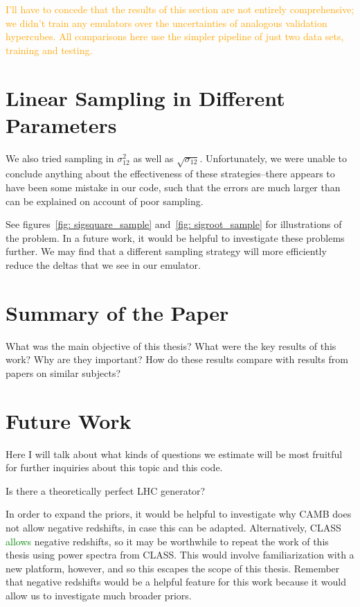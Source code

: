 
\textcolor{orange}{I'll have to concede that the results of this section are not entirely comprehensive; we didn't train any emulators over the uncertainties of analogous validation hypercubes. All comparisons here use the simpler pipeline of just two data sets, training and testing.}


\section{Linear Sampling in Different Parameters}

We also tried sampling in $\sigma_{12}^2$ as well as $\sqrt{\sigma_{12}}$.
Unfortunately, we were unable to conclude anything about the effectiveness of
these strategies--there appears to have been some mistake in our code, such
that the errors are much larger than can be explained on account of poor
sampling.

See figures~\ref{fig: sigsquare_sample} and~\ref{fig: sigroot_sample} for
illustrations of the problem. In a future work, it would be helpful to
investigate these problems further. We may find that a different sampling
strategy will more efficiently reduce the deltas that we see in our emulator.

\section{Summary of the Paper}

What was the main objective of this thesis? What were the key results of this work? Why are they important? How do these results compare with results from papers on similar subjects?

\section{Future Work}
\label{sec: future_work}

Here I will talk about what kinds of questions we estimate will be most fruitful for further inquiries about this topic and this code.

Is there a theoretically perfect LHC generator?

In order to expand the priors, it would be helpful to investigate why CAMB does not allow negative redshifts, in case this can be adapted. Alternatively, CLASS \textcolor{green}{allows} negative redshifts, so it may be worthwhile to repeat the work of this thesis using power spectra from CLASS. This would involve familiarization with a new platform, however, and so this escapes the scope of this thesis. Remember that negative redshifts would be a helpful feature for this work because it would allow us to investigate much broader priors.

